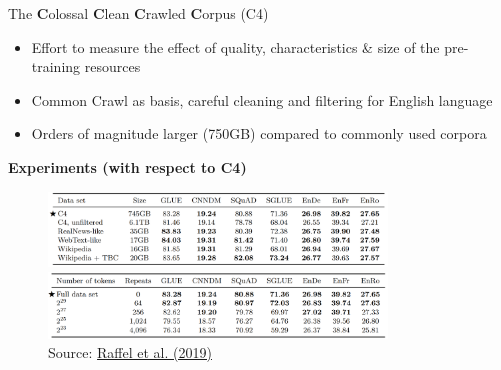 \begin{frame}{The \textbf{C}olossal \textbf{C}lean \textbf{C}rawled \textbf{C}orpus (C4)}
\small
	\begin{itemize}
		\item Effort to measure the effect of quality, characteristics \& size of the pre-training resources
		\item Common Crawl as basis, careful cleaning and filtering for English language
		\item Orders of magnitude larger (750GB) compared to commonly used corpora 
	\end{itemize}
	
	\textbf{Experiments (with respect to C4)}
	
	\begin{figure}
		\centering
		\includegraphics[width = 9cm]{figure/c4-characteristics.png}\\ 
		\includegraphics[width = 9cm]{figure/c4-size.png}\\ 
		\footnotesize{Source:} \href{https://arxiv.org/pdf/1910.10683.pdf}{\footnotesize Raffel et al. (2019)}
	\end{figure}
\end{frame}


